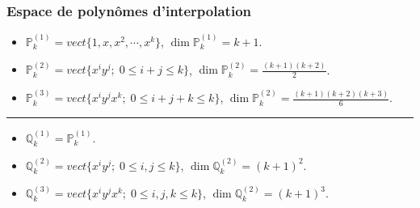 \documentclass{beamer}
\begin{document}

\begin{frame}
\frametitle{Espace de polynômes d'interpolation}

\begin{itemize}
\item $\mathbb{P}_k^{(1)}=vect\{1,x,x^2,\cdots,x^k\}$, $\dim \mathbb{P}_k^{(1)}=k+1$.
\item $\mathbb{P}_k^{(2)}=vect\{x^iy^j;\; 0\leq i+j \leq k\}$, $\dim \mathbb{P}_k^{(2)}=\frac{(k+1)(k+2)}{2}$.
\item $\mathbb{P}_k^{(3)}=vect\{x^iy^jx^k;\; 0\leq i+j+k \leq k\}$, $\dim \mathbb{P}_k^{(2)}=\frac{(k+1)(k+2)(k+3)}{6}$.
\end{itemize}


\hrule


\begin{itemize}
\item $\mathbb{Q}_k^{(1)}=\mathbb{P}_k^{(1)}$.
\item $\mathbb{Q}_k^{(2)}=vect\{x^iy^j;\; 0\leq i,j \leq k\}$, $\dim \mathbb{Q}_k^{(2)}=(k+1)^2$.
\item $\mathbb{Q}_k^{(3)}=vect\{x^iy^jx^k;\; 0\leq i,j,k \leq k\}$, $\dim \mathbb{Q}_k^{(2)}=(k+1)^3$.
\end{itemize}
\end{frame}

\end{document}
